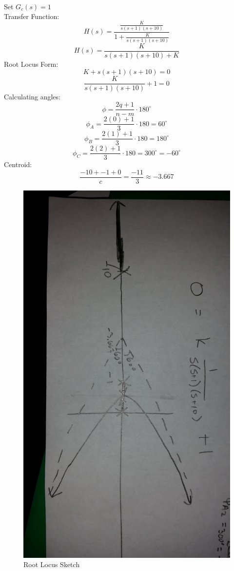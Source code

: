 \documentclass[12pt,letter]{article}
\begin{document}
Set $G_{c}(s)=1$ \\
\noindent Transfer Function: 
$$H(s) = \frac{\frac{K}{s(s+1)(s+10)}}{1+\frac{K}{s(s+1)(s+10)}}$$
$$H(s) = \frac{K}{s(s+1)(s+10)+K}$$
Root Locus Form: $$K+s(s+1)(s+10)=0$$
				$$\frac{K}{s(s+1)(s+10)}+1 =0$$
Calculating angles:
$$\phi = \frac{2q+1}{n-m} \cdot 180^{\circ}$$		
$$\phi_{A} = \frac{2(0)+1}{3} \cdot 180 = 60^{\circ}$$	
$$\phi_{B} = \frac{2(1)+1}{3} \cdot 180 = 180^{\circ}$$
$$\phi_{C} = \frac{2(2)+1}{3} \cdot 180 = 300^{\circ}=-60^{\circ}$$	
Centroid:
$$\frac{-10+-1+0}{c}=\frac{-11}{3}\approx -3.667$$		
\begin{figure}[H]
\centering
\includegraphics[width=1\linewidth]{20150412_213226}
\caption{Root Locus Sketch}
\label{fig:sketch}
\end{figure}
\end{document}
